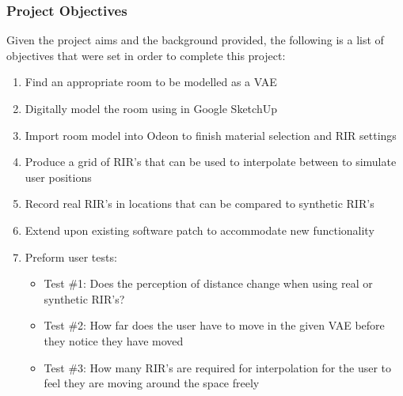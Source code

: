 \documentclass[../../main.tex]{subfiles}
\begin{document}
	\subsubsection{Project Objectives}
	\label{background:objectives}

		Given the project aims and the background provided, the following is a list of objectives that were set in order to complete this project:

		\begin{enumerate}
			\item Find an appropriate room to be modelled as a \ac{VAE} 
			\item Digitally model the room using in Google SketchUp
			\item Import room model into Odeon to finish material selection and \ac{RIR} settings
			\item Produce a grid of \ac{RIR}'s that can be used to interpolate between to simulate user positions
			\item Record real \ac{RIR}'s in locations that can be compared to synthetic \ac{RIR}'s
			\item Extend upon existing software patch to accommodate new functionality
			\item Preform user tests:
				\begin{itemize}
					\item Test \#1: Does the perception of distance change when using real or synthetic \ac{RIR}'s?
					\item Test \#2: How far does the user have to move in the given \ac{VAE} before they notice they have moved 
					\item Test \#3: How many \ac{RIR}'s are required for interpolation for the user to feel they are moving around the space freely
				\end{itemize}
			\end{enumerate}





\end{document}
